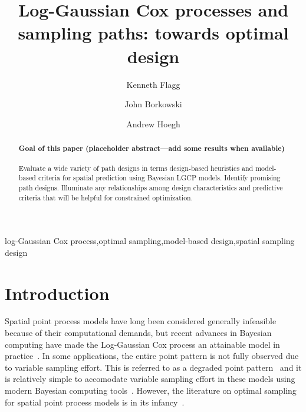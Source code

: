 \documentclass[review]{elsarticle}
\begin{document}
\begin{frontmatter}

\title{Log-Gaussian Cox processes and sampling paths: towards optimal design}

\author[msuaddr]{Kenneth Flagg}

\author[msuaddr]{John Borkowski}
\author[msuaddr]{Andrew Hoegh}

\address[msuaddr]{Department of Mathematical Sciences, Montana State University, Bozeman, MT 59717}

\begin{abstract}

\paragraph{Goal of this paper (placeholder abstract---add some results when
available)} Evaluate a wide variety of path designs in terms design-based
heuristics and model-based criteria for spatial prediction using Bayesian LGCP
models. Identify promising path designs. Illuminate any relationships among
design characteristics and predictive criteria that will be helpful for
constrained optimization.

\end{abstract}

\begin{keyword}
log-Gaussian Cox process\sep optimal sampling\sep model-based design\sep spatial sampling design
\end{keyword}

\end{frontmatter}

\linenumbers



\section{Introduction}

Spatial point process models have long been considered generally infeasible
because of their computational demands, but recent advances in Bayesian
computing have made the Log-Gaussian Cox process an attainable model in
practice~\citep{rueetal, lindgrenetal, illianetal, simpsonetal}. In some
applications, the entire point pattern is not fully observed due to variable
sampling effort. This is referred to as a degraded point
pattern~\citep{chakrabortyetal} and it is relatively simple to accomodate
variable sampling effort in these models using modern Bayesian computing
tools~\citep{yuanetal}. However, the literature on optimal sampling for spatial
point process models is in its infancy~\citep{liuvanhatalo}.
\end{document}
